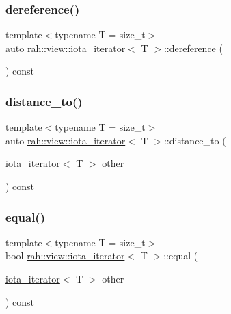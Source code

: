 \subsubsection{\texorpdfstring{dereference()}{dereference()}}
{\footnotesize\ttfamily template$<$typename T  = size\+\_\+t$>$ \\
auto \mbox{\hyperlink{structrah_1_1view_1_1iota__iterator}{rah\+::view\+::iota\+\_\+iterator}}$<$ T $>$\+::dereference (\begin{DoxyParamCaption}{ }\end{DoxyParamCaption}) const\hspace{0.3cm}{\ttfamily [inline]}}

\mbox{\label{structrah_1_1view_1_1iota__iterator_a3662abe8721e4c5c7bbc4214e36c4920}} 
\subsubsection{\texorpdfstring{distance\_to()}{distance\_to()}}
{\footnotesize\ttfamily template$<$typename T  = size\+\_\+t$>$ \\
auto \mbox{\hyperlink{structrah_1_1view_1_1iota__iterator}{rah\+::view\+::iota\+\_\+iterator}}$<$ T $>$\+::distance\+\_\+to (\begin{DoxyParamCaption}\item[{\mbox{\hyperlink{structrah_1_1view_1_1iota__iterator}{iota\+\_\+iterator}}$<$ T $>$}]{other }\end{DoxyParamCaption}) const\hspace{0.3cm}{\ttfamily [inline]}}

\mbox{\label{structrah_1_1view_1_1iota__iterator_ada1691e363efa9b5c945a302296e63d5}} 
\subsubsection{\texorpdfstring{equal()}{equal()}}
{\footnotesize\ttfamily template$<$typename T  = size\+\_\+t$>$ \\
bool \mbox{\hyperlink{structrah_1_1view_1_1iota__iterator}{rah\+::view\+::iota\+\_\+iterator}}$<$ T $>$\+::equal (\begin{DoxyParamCaption}\item[{\mbox{\hyperlink{structrah_1_1view_1_1iota__iterator}{iota\+\_\+iterator}}$<$ T $>$}]{other }\end{DoxyParamCaption}) const\hspace{0.3cm}{\ttfamily [inline]}}


